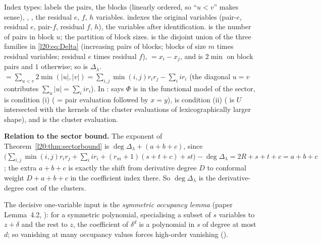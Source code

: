 \begin{dictionary}
Index types:  labels the pairs,  the blocks (linearly ordered, so ``$u<v$'' makes sense),
, ,  the residual $e$, $f$, $h$ variables.  indexes the original variables
(pair-$e$, residual $e$, pair-$f$, residual $f$, $h$),  the variables after identification.
 is the number of pairs in block $u$;  the partition of block sizes.
 is the disjoint union of the three families in \eqref{l20:eq:Delta} (increasing pairs of blocks;
blocks of size $m$ times residual variables; residual $e$ times residual $f$),  $=x_i-x_j$, and
 is $2\min$ on block pairs and $1$ otherwise; so  is $\Delta_\lambda$.
 $=\sum_{u<v}2\min(|u|,|v|)=\sum_{i,j}\min(i,j)r_ir_j-\sum_i ir_i$ (the diagonal $u=v$
contributes $\sum_u|u|=\sum_i ir_i$). In :  says $\Phi$ is in the functional model of the
sector,  is condition (i) ( = pair evaluation followed by $x=y$),  is
condition (ii) ( is $U$ intersected with the kernels of the cluster evaluations of
lexicographically larger shape), and  is the cluster evaluation.

\textbf{Relation to the sector bound.} The exponent of Theorem~\ref{l20:thm:sectorbound} is
$\deg\Delta_\lambda+(a+b+c)$, since $\bigl(\sum_{i,j}\min(i,j)r_ir_j+\sum_iir_i+(r_m+1)(s+t+c)+st\bigr)-\deg\Delta_\lambda
=2R+s+t+c=a+b+c$; the extra $a+b+c$ is exactly the shift from derivative degree $D$ to conformal weight
$D+a+b+c$ in the coefficient index there. So $\deg\Delta_\lambda$ is the derivative-degree cost of the clusters.

The decisive one-variable input is the \emph{symmetric occupancy lemma} (paper Lemma~4.2,
): for a symmetric polynomial, specialising a subset of $s$ variables to $z+\delta$
and the rest to $z$, the coefficient of $\delta^d$ is a polynomial in $s$ of degree at most $d$; so vanishing at
many occupancy values forces high-order vanishing ().
\end{dictionary}

